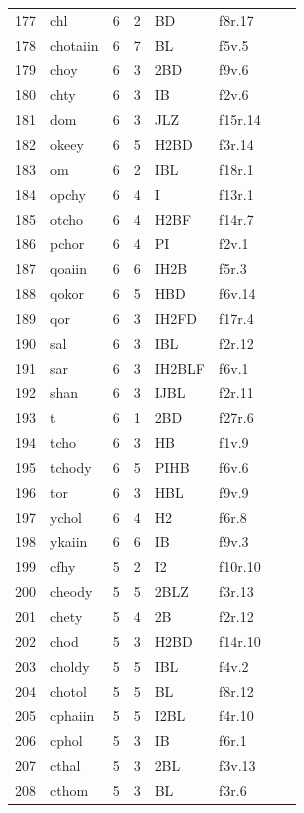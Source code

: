 \documentclass[11pt,a4paper]{article}
\begin{document}
\begin{landscape}
\begin{longtable}{@{}r>{\ttfamily}lrrl>{\ttfamily}l>{\raggedright\arraybackslash}p{80mm}>{\raggedright\arraybackslash}p{36mm}@{}}
177 & chl & 6 & 2 & BD & f8r.17 &  & \\
178 & chotaiin & 6 & 7 & BL & f5v.5 &  & \\
179 & choy & 6 & 3 & 2BD & f9v.6 &  & \\
180 & chty & 6 & 3 & IB & f2v.6 &  & \\
181 & dom & 6 & 3 & JLZ & f15r.14 &  & \\
182 & okeey & 6 & 5 & H2BD & f3r.14 &  & \\
183 & om & 6 & 2 & IBL & f18r.1 &  & \\
184 & opchy & 6 & 4 & I & f13r.1 &  & \\
185 & otcho & 6 & 4 & H2BF & f14r.7 &  & \\
186 & pchor & 6 & 4 & PI & f2v.1 &  & \\
187 & qoaiin & 6 & 6 & IH2B & f5r.3 &  & \\
188 & qokor & 6 & 5 & HBD & f6v.14 &  & \\
189 & qor & 6 & 3 & IH2FD & f17r.4 &  & \\
190 & sal & 6 & 3 & IBL & f2r.12 &  & \\
191 & sar & 6 & 3 & IH2BLF & f6v.1 &  & \\
192 & shan & 6 & 3 & IJBL & f2r.11 &  & \\
193 & t & 6 & 1 & 2BD & f27r.6 &  & \\
194 & tcho & 6 & 3 & HB & f1v.9 &  & \\
195 & tchody & 6 & 5 & PIHB & f6v.6 &  & \\
196 & tor & 6 & 3 & HBL & f9v.9 &  & \\
197 & ychol & 6 & 4 & H2 & f6r.8 &  & \\
198 & ykaiin & 6 & 6 & IB & f9v.3 &  & \\
199 & cfhy & 5 & 2 & I2 & f10r.10 &  & \\
200 & cheody & 5 & 5 & 2BLZ & f3r.13 &  & \\
201 & chety & 5 & 4 & 2B & f2r.12 &  & \\
202 & chod & 5 & 3 & H2BD & f14r.10 &  & \\
203 & choldy & 5 & 5 & IBL & f4v.2 &  & \\
204 & chotol & 5 & 5 & BL & f8r.12 &  & \\
205 & cphaiin & 5 & 5 & I2BL & f4r.10 &  & \\
206 & cphol & 5 & 3 & IB & f6r.1 &  & \\
207 & cthal & 5 & 3 & 2BL & f3v.13 &  & \\
208 & cthom & 5 & 3 & BL & f3r.6 &  & \\

\end{longtable}
\end{landscape}
\end{document}
